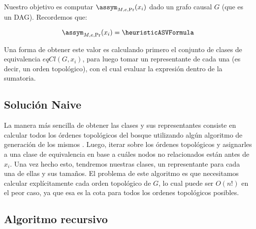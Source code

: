 \begin{comment}
Algoritmo exacto para clases de equivalencias en “árboles”
    Forma Naive
    Cálculo de clases de equivalencia para cada unrelated tree
    Combinar clases de los unrelated tree con ancestros y descendientes
        Combinación con descendientes
        Combinación con ancestros
    Complejidad total
        Complejidad de #UnrEC
        Complejidad de #eqClass
        Complejidad total del algoritmo
\end{comment}

Nuestro objetivo es computar $\assym_{M,e,\Pr}(x_i)$ dado un grafo causal $G$ (que es un DAG). Recordemos que:

$$\assym_{M,e,\Pr}(x_i) = \heuristicASVFormula$$


Una forma de obtener este valor es calculando primero el conjunto de clases de equivalencia $eqCl(G, x_i)$, para luego tomar un representante de cada una (es decir, un orden topológico), con el cual evaluar la expresión dentro de la sumatoria. 

\subsection{Solución Naive} \label{alg:naiveAlgorithmEquivalenceClass}


La manera más sencilla de obtener las clases y sus representantes consiste en calcular todos los órdenes topológicos del bosque utilizando algún algoritmo de generación de los mismos \cite{algorithmForAllTopoSorts}. Luego, iterar sobre los órdenes topológicos y asignarles a una clase de equivalencia en base a cuáles nodos no relacionados están antes de $x_i$. Una vez hecho esto, tendremos nuestras clases, un representante para cada una de ellas y sus tamaños. El problema de este algoritmo es que necesitamos calcular explícitamente cada orden topológico de $G$, lo cual puede ser $O(n!)$ en el peor caso, ya que esa es la cota para todos los ordenes topológicos posibles.

\subsection{Algoritmo recursivo}

